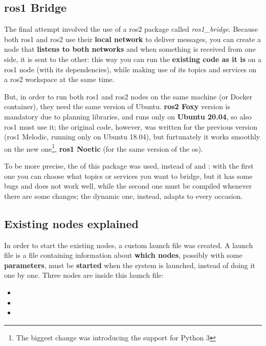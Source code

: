 \subsection{\acrshort{ros}1 Bridge}

The final attempt involved the use of a \acrshort{ros}2 package called \textit{ros1\_bridge}. Because both \acrshort{ros}1 and \acrshort{ros}2 use their \textbf{local network} to deliver messages, you can create a node that \textbf{listens to both networks} and when something is received from one side, it is sent to the other: this way you can run the \textbf{existing code as it is} on a \acrshort{ros}1 node (with its dependencies), while making use of its topics and services on a \acrshort{ros}2 workspace at the same time.

But, in order to run both \acrshort{ros}1 and \acrshort{ros}2 nodes on the same machine (or Docker container), they need the same version of Ubuntu. \textbf{\acrshort{ros}2 Foxy} version is mandatory due to planning libraries, and runs only on \textbf{Ubuntu 20.04}, so also \acrshort{ros}1 must use it; the original code, however, was written for the previous version (\acrshort{ros}1 Melodic, running only on Ubuntu 18.04), but furtunately it works smoothly on the new one\footnote{The biggest change was introducing the support for Python 3}, \textbf{\acrshort{ros}1 Noetic} (for the same version of the \acrshort{os}).

To be more precise, the  of this package was used, instead of  and : with the first one you can choose what topics or services you want to bridge, but it has some bugs and does not work well, while the second one must be compiled whenever there are some changes; the dynamic one, instead, adapts to every occasion.

\subsection{Existing nodes explained}
\label{subsec:nodes}

In order to start the existing nodes, a custom launch file was created. A launch file is a file containing information about \textbf{which nodes}, possibly with some \textbf{parameters}, must be \textbf{started} when the system is launched, instead of doing it one by one. Three nodes are inside this launch file:

\begin{itemize}
    \item {}
    \item {}
    \item {}
\end{itemize}


